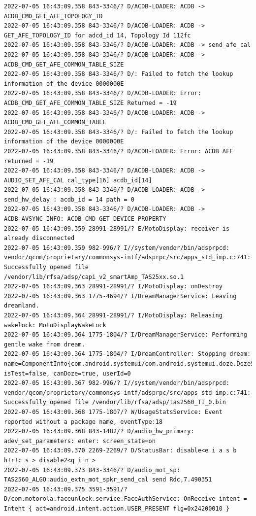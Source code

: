 \documentclass[a4paper,12pt]{book}
\begin{document}
\begin{lstlisting}
2022-07-05 16:43:09.358 843-3346/? D/ACDB-LOADER: ACDB -> ACDB_CMD_GET_AFE_TOPOLOGY_ID
2022-07-05 16:43:09.358 843-3346/? D/ACDB-LOADER: ACDB -> GET_AFE_TOPOLOGY_ID for adcd_id 14, Topology Id 112fc
2022-07-05 16:43:09.358 843-3346/? D/ACDB-LOADER: ACDB -> send_afe_cal
2022-07-05 16:43:09.358 843-3346/? D/ACDB-LOADER: ACDB -> ACDB_CMD_GET_AFE_COMMON_TABLE_SIZE
2022-07-05 16:43:09.358 843-3346/? D/: Failed to fetch the lookup information of the device 0000000E 
2022-07-05 16:43:09.358 843-3346/? D/ACDB-LOADER: Error: ACDB_CMD_GET_AFE_COMMON_TABLE_SIZE Returned = -19
2022-07-05 16:43:09.358 843-3346/? D/ACDB-LOADER: ACDB -> ACDB_CMD_GET_AFE_COMMON_TABLE
2022-07-05 16:43:09.358 843-3346/? D/: Failed to fetch the lookup information of the device 0000000E 
2022-07-05 16:43:09.358 843-3346/? D/ACDB-LOADER: Error: ACDB AFE returned = -19
2022-07-05 16:43:09.358 843-3346/? D/ACDB-LOADER: ACDB -> AUDIO_SET_AFE_CAL cal_type[16] acdb_id[14]
2022-07-05 16:43:09.358 843-3346/? D/ACDB-LOADER: ACDB -> send_hw_delay : acdb_id = 14 path = 0
2022-07-05 16:43:09.358 843-3346/? D/ACDB-LOADER: ACDB -> ACDB_AVSYNC_INFO: ACDB_CMD_GET_DEVICE_PROPERTY
2022-07-05 16:43:09.359 28991-28991/? E/MotoDisplay: receiver is already disconnected
2022-07-05 16:43:09.359 982-996/? I//system/vendor/bin/adsprpcd: vendor/qcom/proprietary/commonsys-intf/adsprpc/src/apps_std_imp.c:741: Successfully opened file /vendor/lib/rfsa/adsp/capi_v2_smartAmp_TAS25xx.so.1
2022-07-05 16:43:09.363 28991-28991/? I/MotoDisplay: onDestroy
2022-07-05 16:43:09.363 1775-4694/? I/DreamManagerService: Leaving dreamland.
2022-07-05 16:43:09.364 28991-28991/? I/MotoDisplay: Releasing wakelock: MotoDisplayWakeLock
2022-07-05 16:43:09.364 1775-1804/? I/DreamManagerService: Performing gentle wake from dream.
2022-07-05 16:43:09.364 1775-1804/? I/DreamController: Stopping dream: name=ComponentInfo{com.android.systemui/com.android.systemui.doze.DozeService}, isTest=false, canDoze=true, userId=0
2022-07-05 16:43:09.367 982-996/? I//system/vendor/bin/adsprpcd: vendor/qcom/proprietary/commonsys-intf/adsprpc/src/apps_std_imp.c:741: Successfully opened file /vendor/lib/rfsa/adsp/tas2560_TI_0.bin
2022-07-05 16:43:09.368 1775-1807/? W/UsageStatsService: Event reported without a package name, eventType:18
2022-07-05 16:43:09.368 843-1482/? D/audio_hw_primary: adev_set_parameters: enter: screen_state=on
2022-07-05 16:43:09.370 2269-2269/? D/StatusBar: disable<e i a s b h!r!c s > disable2<q i n >
2022-07-05 16:43:09.373 843-3346/? D/audio_mot_sp: TAS2560_ALGO:audio_extn_mot_spkr_send_cal send Rdc,7.490351
2022-07-05 16:43:09.375 3591-3591/? D/com.motorola.faceunlock.service.FaceAuthService: OnReceive intent = Intent { act=android.intent.action.USER_PRESENT flg=0x24200010 }

\end{lstlisting}
\end{document}
